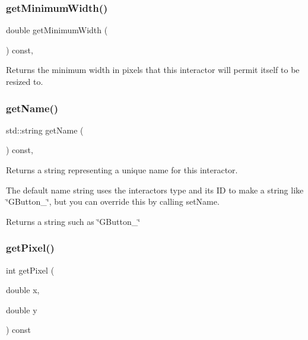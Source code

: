 \subsubsection{\texorpdfstring{get\+Minimum\+Width()}{getMinimumWidth()}}
{\footnotesize\ttfamily double get\+Minimum\+Width (\begin{DoxyParamCaption}{ }\end{DoxyParamCaption}) const\hspace{0.3cm}{\ttfamily [virtual]}, {\ttfamily [inherited]}}



Returns the minimum width in pixels that this interactor will permit itself to be resized to. 

\mbox{\label{classGInteractor_a8a60438a5b55d0b2ceb35c8674b9d8c5}} 
\subsubsection{\texorpdfstring{get\+Name()}{getName()}}
{\footnotesize\ttfamily std\+::string get\+Name (\begin{DoxyParamCaption}{ }\end{DoxyParamCaption}) const\hspace{0.3cm}{\ttfamily [virtual]}, {\ttfamily [inherited]}}



Returns a string representing a unique name for this interactor. 

The default name string uses the interactor\textquotesingle{}s type and its ID to make a string like \char`\"{}\+G\+Button\+\_\char`\"{}, but you can override this by calling set\+Name. \begin{DoxyReturn}{Returns}
a string such as \char`\"{}\+G\+Button\+\_\char`\"{} 
\end{DoxyReturn}
\mbox{\label{classGCanvas_a076754305680c65782a00ddd3c77b50b}} 
\subsubsection{\texorpdfstring{get\+Pixel()}{getPixel()}}
{\footnotesize\ttfamily int get\+Pixel (\begin{DoxyParamCaption}\item[{double}]{x,  }\item[{double}]{y }\end{DoxyParamCaption}) const\hspace{0.3cm}{\ttfamily [virtual]}}



